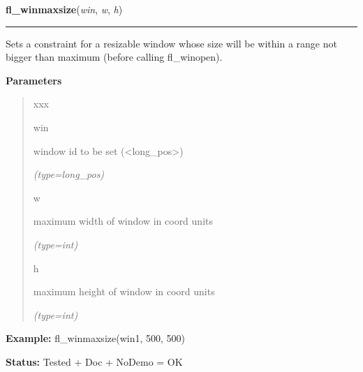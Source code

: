 \hspace{.8\funcindent}\begin{boxedminipage}{\funcwidth}

    \raggedright \textbf{fl\_winmaxsize}(\textit{win}, \textit{w}, \textit{h})

    \vspace{-1.5ex}

    \rule{\textwidth}{0.5\fboxrule}
\setlength{\parskip}{2ex}
    Sets a constraint for a resizable window whose size will be within a 
    range not bigger than maximum (before calling fl\_winopen).

\setlength{\parskip}{1ex}
      \textbf{Parameters}
      \vspace{-1ex}

      \begin{quote}
        \begin{Ventry}{xxx}

          \item[win]

          window id to be set ({\textless}long\_pos{\textgreater})

            {\it (type=long\_pos)}

          \item[w]

          maximum width of window in coord units

            {\it (type=int)}

          \item[h]

          maximum height of window in coord units

            {\it (type=int)}

        \end{Ventry}

      \end{quote}

\textbf{Example:} fl\_winmaxsize(win1, 500, 500)



\textbf{Status:} Tested + Doc + NoDemo = OK



    \end{boxedminipage}

    \label{xformslib:flxbasic:fl_winaspect}

    \vspace{0.5ex}

